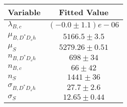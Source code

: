 \begin{tabular}[t]{lc}
\hline
Variable &Fitted Value\\
\hline\hline
$\lambda_{B,c}$&$(-0.0\pm1.1)e-06$\\
\hline
$\mu_{B, D^* D_s h}$&$5166.5\pm3.5$\\
\hline
$\mu_S$&$5279.26\pm0.51$\\
\hline
$n_{B, D^* D_s h}$&$698\pm34$\\
\hline
$n_{B,c}$&$66\pm42$\\
\hline
$n_S$&$1441\pm36$\\
\hline
$\sigma_{B, D^* D_s h}$&$27.7\pm2.6$\\
\hline
$\sigma_S$&$12.65\pm0.44$\\
\hline
\end{tabular}